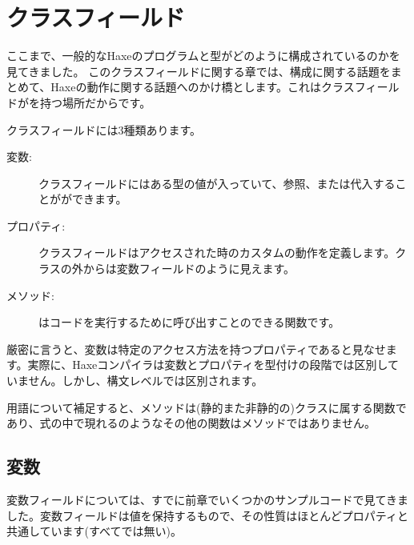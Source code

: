 \chapter{クラスフィールド}
\label{class-field}


ここまで、一般的なHaxeのプログラムと型がどのように構成されているのかを見てきました。
このクラスフィールドに関する章では、構成に関する話題をまとめて、Haxeの動作に関する話題へのかけ橋とします。これはクラスフィールドがを持つ場所だからです。

クラスフィールドには3種類あります。

\begin{description}
	\item[変数:] クラスフィールドにはある型の値が入っていて、参照、または代入することがができます。
	\item[プロパティ:] クラスフィールドはアクセスされた時のカスタムの動作を定義します。クラスの外からは変数フィールドのように見えます。
	\item[メソッド:] はコードを実行するために呼び出すことのできる関数です。
\end{description}

厳密に言うと、変数は特定のアクセス方法を持つプロパティであると見なせます。実際に、Haxeコンパイラは変数とプロパティを型付けの段階では区別していません。しかし、構文レベルでは区別されます。

用語について補足すると、メソッドは(静的また非静的の)クラスに属する関数であり、式の中で現れるのようなその他の関数はメソッドではありません。

\section{変数}
\label{class-field-variable}

変数フィールドについては、すでに前章でいくつかのサンプルコードで見てきました。変数フィールドは値を保持するもので、その性質はほとんどプロパティと共通しています(すべてでは無い)。


